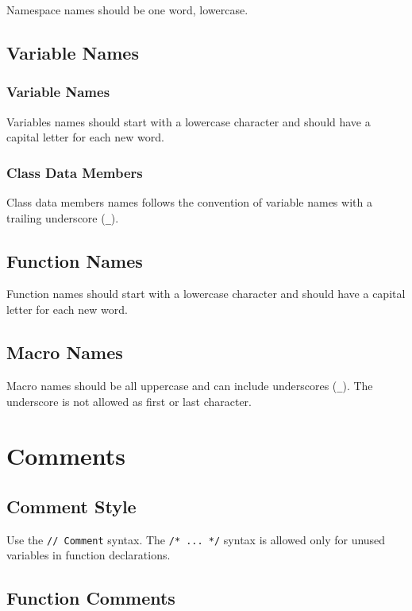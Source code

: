 \documentclass[a4paper]{article}
\newcommand{\inlinecode}[1]{\lstinline|#1|}
\begin{document}
Namespace names should be one word, lowercase.

\subsection{Variable Names}

\subsubsection{Variable Names}

Variables names should start with a lowercase character and should have a capital letter for each new word.

\subsubsection{Class Data Members}

Class data members names follows the convention of variable names with a trailing underscore (\inlinecode{_}).

\subsection{Function Names}

Function names should start with a lowercase character and should have a capital letter for each new word.

\subsection{Macro Names}

Macro names should be all uppercase and can include underscores (\inlinecode{_}). The underscore is not allowed as first or last character.

\section{Comments}

\subsection{Comment Style}

Use the \inlinecode{// Comment} syntax. The \inlinecode{/* ... */} syntax is allowed only for unused variables in function declarations.

\subsection{Function Comments}
\end{document}
